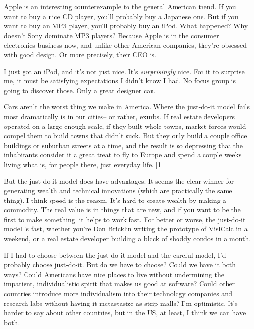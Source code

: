 Apple is an interesting counterexample to the
                  general American trend. If you want to buy a nice CD player,
                  you'll probably buy a Japanese one. But if you want to buy an
                  MP3 player, you'll probably buy an iPod. What happened? Why
                  doesn't Sony dominate MP3 players? Because Apple is in the
                  consumer electronics business now, and unlike other American
                  companies, they're obsessed with good design. Or more
                  precisely, their CEO is.

I just got an iPod, and
                  it's not just nice. It's \emph{surprisingly} nice. For it to
                  surprise me, it must be satisfying expectations I didn't know
                  I had. No focus group is going to discover those. Only a great
                  designer can.



Cars aren't the worst
                  thing we make in America. Where the just-do-it model fails
                  most dramatically is in our cities-- or rather,
                  \href{http://www.paulgraham.com/denver.html}{exurbs}. If real estate developers
                  operated on a large enough scale, if they built whole towns,
                  market forces would compel them to build towns that didn't
                  suck. But they only build a couple office buildings or
                  suburban streets at a time, and the result is so depressing
                  that the inhabitants consider it a great treat to fly to
                  Europe and spend a couple weeks living what is, for people
                  there, just everyday life. [1]

But the just-do-it
                  model does have advantages. It seems the clear winner for
                  generating wealth and technical innovations (which are
                  practically the same thing). I think speed is the reason. It's
                  hard to create wealth by making a commodity. The real value is
                  in things that are new, and if you want to be the first to
                  make something, it helps to work fast. For better or worse,
                  the just-do-it model is fast, whether you're Dan Bricklin
                  writing the prototype of VisiCalc in a weekend, or a real
                  estate developer building a block of shoddy condos in a
                  month.

If I had to choose between the just-do-it
                  model and the careful model, I'd probably choose just-do-it.
                  But do we have to choose? Could we have it both ways? Could
                  Americans have nice places to live without undermining the
                  impatient, individualistic spirit that makes us good at
                  software? Could other countries introduce more individualism
                  into their technology companies and research labs without
                  having it metastasize as strip malls? I'm optimistic. It's
                  harder to say about other countries, but in the US, at least,
                  I think we can have both.

